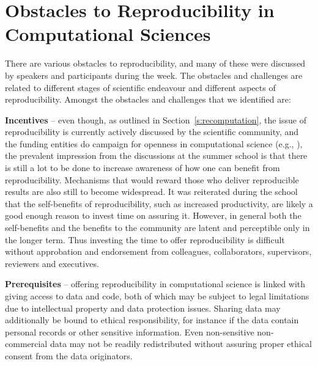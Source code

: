\section{Obstacles to Reproducibility in Computational Sciences}
\label{s:obstacles}

There are various obstacles to reproducibility, and many of these were
  discussed by speakers and participants during the week. 
The obstacles and challenges are related to different stages of scientific 
  endeavour and different aspects of reproducibility.
Amongst the obstacles and challenges that we identified are:

{\bf Incentives} -- even though, as outlined in Section~\ref{s:recomputation}, 
  the issue of reproducibility is
  currently actively discussed by the scientific community, 
  and the funding entities do campaign for
  openness in computational science (e.g., \cite{NSF}), 
  the prevalent impression from the discussions at 
  the summer school is that there is still a lot to be done to increase 
  awareness of how one can benefit from reproducibility.
Mechanisms that would reward those who deliver reproducible results are also
  still to become widespread.
It was reiterated during the school that the self-benefits 
  of reproducibility, such as increased productivity, are likely 
  a good enough reason to invest time on assuring it.
However, in general both the self-benefits and the benefits to the community
  are latent and perceptible only in the longer term.
Thus investing the time to offer reproducibility is difficult without
  approbation and endorsement from colleagues, collaborators, supervisors,
  reviewers and executives.
  
{\bf Prerequisites} -- offering reproducibility in computational
  science is linked with giving access to data and code, both of which may
  be subject to legal limitations due to intellectual property and
  data protection issues.
Sharing data may additionally be bound to ethical responsibility, for instance
  if the data contain personal records or other sensitive information.  
Even non-sensitive non-commercial data may not be readily redistributed
  without assuring proper ethical consent from the data originators.

